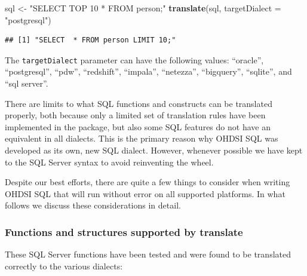 \documentclass[11pt]{book}
\newenvironment{Shaded}{\begin{snugshade}}{\end{snugshade}}
\newcommand{\DataTypeTok}[1]{\textcolor[rgb]{0.13,0.29,0.53}{#1}}
\newcommand{\KeywordTok}[1]{\textcolor[rgb]{0.13,0.29,0.53}{\textbf{#1}}}
\newcommand{\NormalTok}[1]{#1}
\newcommand{\StringTok}[1]{\textcolor[rgb]{0.31,0.60,0.02}{#1}}
\theoremstyle{definition}
\theoremstyle{definition}
\theoremstyle{definition}
\theoremstyle{remark}
\let\BeginKnitrBlock\begin \let\EndKnitrBlock\end
\begin{document}
\begin{Shaded}
\begin{Highlighting}[]
\NormalTok{sql <-}\StringTok{ "SELECT TOP 10 * FROM person;"}
\KeywordTok{translate}\NormalTok{(sql, }\DataTypeTok{targetDialect =} \StringTok{"postgresql"}\NormalTok{)}
\end{Highlighting}
\end{Shaded}

\begin{verbatim}
## [1] "SELECT  * FROM person LIMIT 10;"
\end{verbatim}

The \texttt{targetDialect} parameter can have the following values: ``oracle'', ``postgresql'', ``pdw'', ``redshift'', ``impala'', ``netezza'', ``bigquery'', ``sqlite'', and ``sql server''. 

\BeginKnitrBlock{rmdimportant}
There are limits to what SQL functions and constructs can be translated properly, both because only a limited set of translation rules have been implemented in the package, but also some SQL features do not have an equivalent in all dialects. This is the primary reason why OHDSI SQL was developed as its own, new SQL dialect. However, whenever possible we have kept to the SQL Server syntax to avoid reinventing the wheel.
\EndKnitrBlock{rmdimportant}

Despite our best efforts, there are quite a few things to consider when writing OHDSI SQL that will run without error on all supported platforms. In what follows we discuss these considerations in detail.

\hypertarget{functions-and-structures-supported-by-translate}{%
\subsubsection*{Functions and structures supported by translate}\label{functions-and-structures-supported-by-translate}}

These SQL Server functions have been tested and were found to be translated correctly to the various dialects:
\end{document}

